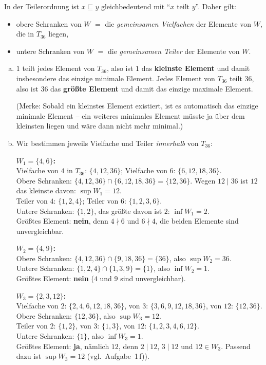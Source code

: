 \begin{loesung}
In der Teilerordnung ist $x\sqsubseteq y$ gleichbedeutend mit \enquote{$x$ teilt $y$}. Daher gilt:
\begin{itemize}
  \item obere Schranken von $W$ $=$ die \emph{gemeinsamen Vielfachen} der Elemente von $W$, die in $T_{36}$ liegen,
  \item untere Schranken von $W$ $=$ die \emph{gemeinsamen Teiler} der Elemente von $W$.
\end{itemize}

\begin{enumerate}[a)]
  \item $1$ teilt jedes Element von $T_{36}$, also ist $1$ das \textbf{kleinste Element} und damit insbesondere das einzige minimale Element. Jedes Element von $T_{36}$ teilt $36$, also ist $36$ das \textbf{größte Element} und damit das einzige maximale Element.

  (Merke: Sobald ein kleinstes Element existiert, ist es automatisch das einzige minimale Element -- ein weiteres minimales Element müsste ja über dem kleinsten liegen und wäre dann nicht mehr minimal.)

  \item Wir bestimmen jeweils Vielfache und Teiler \emph{innerhalb} von $T_{36}$:

  \textbf{$W_1=\{4,6\}$:}\\
  Vielfache von $4$ in $T_{36}$: $\{4,12,36\}$; Vielfache von $6$: $\{6,12,18,36\}$.\\
  Obere Schranken: $\{4,12,36\}\cap\{6,12,18,36\}=\{12,36\}$. Wegen $12\mid 36$ ist $12$ das kleinste davon: $\sup W_1=12$.\\
  Teiler von $4$: $\{1,2,4\}$; Teiler von $6$: $\{1,2,3,6\}$.\\
  Untere Schranken: $\{1,2\}$, das größte davon ist $2$: $\inf W_1=2$.\\
  Größtes Element: \textbf{nein}, denn $4\nmid 6$ und $6\nmid 4$, die beiden Elemente sind unvergleichbar.

  \textbf{$W_2=\{4,9\}$:}\\
  Obere Schranken: $\{4,12,36\}\cap\{9,18,36\}=\{36\}$, also $\sup W_2=36$.\\
  Untere Schranken: $\{1,2,4\}\cap\{1,3,9\}=\{1\}$, also $\inf W_2=1$.\\
  Größtes Element: \textbf{nein} ($4$ und $9$ sind unvergleichbar).

  \textbf{$W_3=\{2,3,12\}$:}\\
  Vielfache von $2$: $\{2,4,6,12,18,36\}$, von $3$: $\{3,6,9,12,18,36\}$, von $12$: $\{12,36\}$.\\
  Obere Schranken: $\{12,36\}$, also $\sup W_3=12$.\\
  Teiler von $2$: $\{1,2\}$, von $3$: $\{1,3\}$, von $12$: $\{1,2,3,4,6,12\}$.\\
  Untere Schranken: $\{1\}$, also $\inf W_3=1$.\\
  Größtes Element: \textbf{ja}, nämlich $12$, denn $2\mid 12$, $3\mid 12$ und $12\in W_3$. Passend dazu ist $\sup W_3=12$ (vgl.\ Aufgabe~1\,f)).


\end{enumerate}
\end{loesung}

